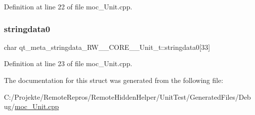 Definition at line 22 of file moc\+\_\+\+Unit.\+cpp.

\hypertarget{structqt__meta__stringdata___r_w_____c_o_r_e_____unit__t_aa2fe6b0b151b388dcd58fd8c0b60edfd}{}\label{structqt__meta__stringdata___r_w_____c_o_r_e_____unit__t_aa2fe6b0b151b388dcd58fd8c0b60edfd} 
\subsubsection{\texorpdfstring{stringdata0}{stringdata0}}
{\footnotesize\ttfamily char qt\+\_\+meta\+\_\+stringdata\+\_\+\+R\+W\+\_\+\+\_\+\+C\+O\+R\+E\+\_\+\+\_\+\+Unit\+\_\+t\+::stringdata0\mbox{[}33\mbox{]}}



Definition at line 23 of file moc\+\_\+\+Unit.\+cpp.



The documentation for this struct was generated from the following file\+:\begin{DoxyCompactItemize}
\item 
C\+:/\+Projekte/\+Remote\+Repros/\+Remote\+Hidden\+Helper/\+Unit\+Test/\+Generated\+Files/\+Debug/\hyperlink{moc___unit_8cpp}{moc\+\_\+\+Unit.\+cpp}\end{DoxyCompactItemize}
